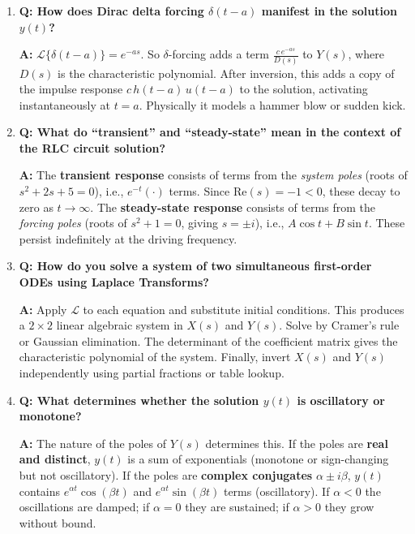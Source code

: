 \documentclass[12pt,a4paper]{article}
\begin{document}
\begin{enumerate}
\item \textbf{Q: How does Dirac delta forcing $\delta(t-a)$ manifest in the solution $y(t)$?}

\textbf{A:} $\mathcal{L}\{\delta(t-a)\} = e^{-as}$. So $\delta$-forcing adds a term
$\tfrac{c\,e^{-as}}{D(s)}$ to $Y(s)$, where $D(s)$ is the characteristic polynomial.
After inversion, this adds a copy of the impulse response $c\,h(t-a)\,u(t-a)$ to the
solution, activating instantaneously at $t=a$. Physically it models a hammer blow or
sudden kick.

\item \textbf{Q: What do ``transient'' and ``steady-state'' mean in the context of the RLC circuit solution?}

\textbf{A:} The \textbf{transient response} consists of terms from the
\emph{system poles} (roots of $s^2+2s+5=0$), i.e., $e^{-t}(\cdot)$ terms. Since
$\text{Re}(s) = -1 < 0$, these decay to zero as $t\to\infty$. The \textbf{steady-state
response} consists of terms from the \emph{forcing poles} (roots of $s^2+1=0$, giving
$s=\pm i$), i.e., $A\cos t + B\sin t$. These persist indefinitely at the driving frequency.

\item \textbf{Q: How do you solve a system of two simultaneous first-order ODEs using Laplace Transforms?}

\textbf{A:} Apply $\mathcal{L}$ to each equation and substitute initial conditions.
This produces a $2\times 2$ linear algebraic system in $X(s)$ and $Y(s)$. Solve by
Cramer's rule or Gaussian elimination. The determinant of the coefficient matrix gives
the characteristic polynomial of the system. Finally, invert $X(s)$ and $Y(s)$
independently using partial fractions or table lookup.

\item \textbf{Q: What determines whether the solution $y(t)$ is oscillatory or monotone?}

\textbf{A:} The nature of the poles of $Y(s)$ determines this. If the poles are
\textbf{real and distinct}, $y(t)$ is a sum of exponentials (monotone or sign-changing
but not oscillatory). If the poles are \textbf{complex conjugates} $\alpha \pm i\beta$,
$y(t)$ contains $e^{\alpha t}\cos(\beta t)$ and $e^{\alpha t}\sin(\beta t)$ terms
(oscillatory). If $\alpha<0$ the oscillations are damped; if $\alpha=0$ they are
sustained; if $\alpha>0$ they grow without bound.

\end{enumerate}
\end{document}
